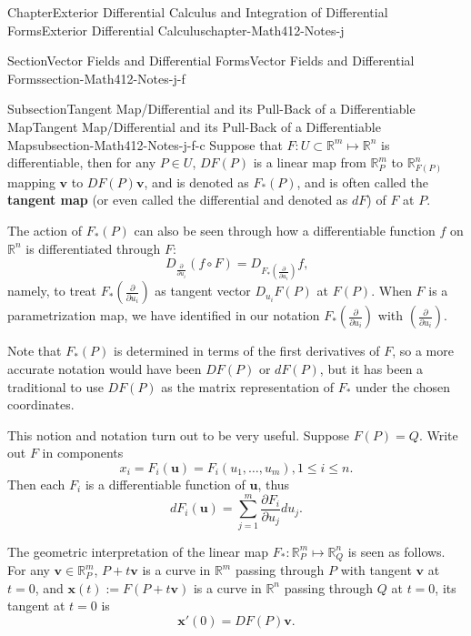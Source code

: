 \documentclass[oneside,10pt,]{book}
\newcommand{\terminology}[1]{\textbf{#1}}
\numberwithin{equation}{section}
\newcommand{\bv}{\mathbf{v}}
\newcommand{\bbR}{\mathbb{R}}
\begin{document}
\begin{chapterptx}{Chapter}{Exterior Differential Calculus and Integration of Differential Forms}{}{Exterior Differential Calculus}{}{}{chapter-Math412-Notes-j}
\begin{sectionptx}{Section}{Vector Fields and Differential Forms}{}{Vector Fields and Differential Forms}{}{}{section-Math412-Notes-j-f}
\begin{subsectionptx}{Subsection}{Tangent Map\slash{}Differential and its Pull-Back of a Differentiable Map}{}{Tangent Map\slash{}Differential and its Pull-Back of a Differentiable Map}{}{}{subsection-Math412-Notes-j-f-c}
Suppose that \(F: U\subset \bbR^{m}\mapsto \bbR^{n}\) is differentiable, then for any \(P\in U\), \(DF(P)\) is a linear map from \(\bbR^{m}_{P} \) to \(\bbR^{n}_{F(P)}\) mapping \(\bv\) to \(DF(P)\bv\), and is denoted as \(F_{*}(P)\), and is often called the \terminology{tangent map} (or even called the differential and denoted as \(dF\)) of \(F\) at \(P\).%
\par
The action of \(F_{*}(P)\) can also be seen through how a differentiable function \(f\) on \(\bbR^{n}\) is differentiated through \(F\):%
\begin{equation*}
D_{\frac{\partial  }{\partial u_{i}}}\left( f\circ F\right)=D_{F_{*}\left(\frac{\partial  }{\partial u_{i}}\right) }f\text{,}
\end{equation*}
namely, to treat \(F_{*}\left(\frac{\partial  }{\partial u_{i}}\right)\) as tangent vector \(D_{u_{i}}F(P)\) at \(F(P)\).  When \(F\) is a parametrization map, we have identified  in our notation \(F_{*}\left(\frac{\partial  }{\partial u_{i}}\right)\) with \(\left(\frac{\partial  }{\partial u_{i}}\right)\).%
\par
Note that \(F_{*}(P)\) is determined in terms of the first derivatives of \(F\), so a more accurate notation would have been \(DF(P)\) or \(dF(P)\), but it has been a traditional to use \(DF(P)\) as the matrix representation of \(F_{*}\) under the chosen coordinates.%
\par
This notion and notation turn out to be very useful. Suppose  \(F(P)=Q\). Write out \(F\) in components%
\begin{equation*}
x_{i}= F_{i}({\mathbf u})=F_{i}(u_{1},\ldots, u_{m}), 1\le i \le n.
\end{equation*}
Then each \(F_{i}\) is a differentiable function of \({\mathbf u}\), thus%
\begin{equation*}
dF_{i}({\mathbf u})=\sum_{j=1}^{m}\frac{\partial F_{i}}{\partial u_{j}}du_{j}.
\end{equation*}
%
\par
The geometric interpretation of the linear map \(F_{*}: {\mathbb R}^{m}_{P} \mapsto 
{\mathbb R}^{n}_{Q}\) is seen as follows. For any \({\bv}\in {\mathbb R}^{m}_{P}\), \(P+t{\bv}\) is  a curve in \({\mathbb R}^{m}\) passing through \(P\) with tangent \({\bv}\) at \(t=0\), and \({\mathbf x}(t):=F(P+t{\bv})\) is a curve in \({\mathbb R}^{n}\) passing through \(Q\) at \(t=0\), its tangent at \(t=0\) is%
\begin{equation*}
{\mathbf x}'(0)=DF(P) {\bv}.
\end{equation*}

\end{subsectionptx}
\end{sectionptx}
\end{chapterptx}
\end{document}

